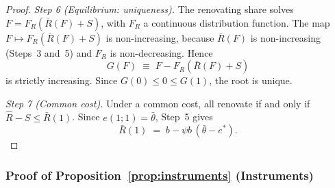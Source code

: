 \begin{proof}
\emph{Step 6 (Equilibrium: uniqueness).} The renovating share solves $F=F_R(\bar R(F)+S)$, with $F_R$ a continuous distribution function. The map $F\mapsto F_R(\bar R(F)+S)$ is non-increasing, because $\bar R(F)$ is non-increasing (Steps~3 and~5) and $F_R$ is non-decreasing. Hence
\begin{equation*}
    G(F)\;\equiv\;F-F_R(\bar R(F)+S)
\end{equation*}
is strictly increasing. Since $G(0)\le0\le G(1)$, the root is unique.

\emph{Step 7 (Common cost).} Under a common cost, all renovate if and only if $\hat R-S\le\bar R(1)$. Since $e(1;1)=\bar\theta$, Step~5 gives
\begin{equation*}
    \bar R(1)\;=\;b-\psi b\,(\bar\theta-e^*).
\end{equation*}
\end{proof}

\subsubsection*{Proof of Proposition~\ref{prop:instruments} (Instruments)}

